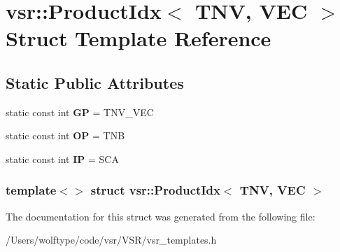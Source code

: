\hypertarget{structvsr_1_1_product_idx_3_01_t_n_v_00_01_v_e_c_01_4}{\section{vsr\-:\-:Product\-Idx$<$ T\-N\-V, V\-E\-C $>$ Struct Template Reference}
\label{structvsr_1_1_product_idx_3_01_t_n_v_00_01_v_e_c_01_4}
}
\subsection*{Static Public Attributes}
\begin{DoxyCompactItemize}
\item 
\hypertarget{structvsr_1_1_product_idx_3_01_t_n_v_00_01_v_e_c_01_4_a412912498f6ebd1b89e16cf3b1f96c5f}{static const int {\bfseries G\-P} = T\-N\-V\-\_\-\-V\-E\-C}\label{structvsr_1_1_product_idx_3_01_t_n_v_00_01_v_e_c_01_4_a412912498f6ebd1b89e16cf3b1f96c5f}

\item 
\hypertarget{structvsr_1_1_product_idx_3_01_t_n_v_00_01_v_e_c_01_4_abb491930381ce87e250a6fe69e690900}{static const int {\bfseries O\-P} = T\-N\-B}\label{structvsr_1_1_product_idx_3_01_t_n_v_00_01_v_e_c_01_4_abb491930381ce87e250a6fe69e690900}

\item 
\hypertarget{structvsr_1_1_product_idx_3_01_t_n_v_00_01_v_e_c_01_4_a2ca321924875af15094eb3cc54ab8f70}{static const int {\bfseries I\-P} = S\-C\-A}\label{structvsr_1_1_product_idx_3_01_t_n_v_00_01_v_e_c_01_4_a2ca321924875af15094eb3cc54ab8f70}

\end{DoxyCompactItemize}
\subsubsection*{template$<$$>$ struct vsr\-::\-Product\-Idx$<$ T\-N\-V, V\-E\-C $>$}



The documentation for this struct was generated from the following file\-:\begin{DoxyCompactItemize}
\item 
/\-Users/wolftype/code/vsr/\-V\-S\-R/vsr\-\_\-templates.\-h\end{DoxyCompactItemize}
